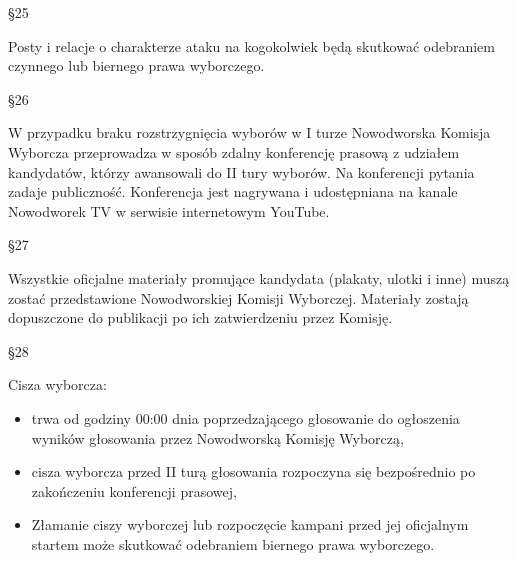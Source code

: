 \documentclass[12pt]{article}
\begin{document}
    \begin{center}
        \S 25\\
    \end{center} 
    Posty i relacje o charakterze ataku na kogokolwiek będą skutkować odebraniem czynnego lub biernego prawa wyborczego.\\
    \begin{center}
        \S 26\\
    \end{center} 
    W przypadku braku rozstrzygnięcia wyborów w I turze Nowodworska Komisja Wyborcza przeprowadza w sposób zdalny konferencję prasową z udziałem kandydatów, którzy awansowali do II tury wyborów. Na konferencji pytania zadaje publiczność. Konferencja jest nagrywana i udostępniana na kanale Nowodworek TV w serwisie internetowym YouTube. \\
    \begin{center}
        \S 27\\
    \end{center} 
    Wszystkie oficjalne materiały promujące kandydata (plakaty, ulotki i inne) muszą zostać  przedstawione Nowodworskiej Komisji Wyborczej.  Materiały zostają dopuszczone do publikacji po ich zatwierdzeniu przez Komisję.\\
    \begin{center}
        \S 28\\
    \end{center} 
    Cisza wyborcza:
    \begin{itemize}
        \item trwa  od godziny 00:00 dnia   poprzedzającego głosowanie   do ogłoszenia wyników głosowania przez Nowodworską Komisję Wyborczą,
        \item  cisza wyborcza przed II turą głosowania rozpoczyna się bezpośrednio  po zakończeniu konferencji prasowej,
        \item Złamanie ciszy wyborczej lub rozpoczęcie kampani przed jej oficjalnym startem  może skutkować odebraniem biernego prawa wyborczego. 
    \end{itemize}
    
\end{document}
